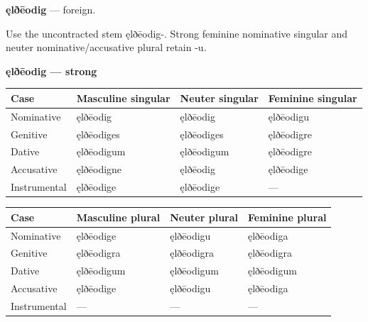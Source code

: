 \par\begin{minipage}{\linewidth}\raggedright
\textbf{ęlðēodig} — foreign.

Use the uncontracted stem ęlðēodig-. Strong feminine nominative singular and neuter nominative/\allowbreak{}accusative plural retain -u.

\textbf{ęlðēodig — strong}

\par\begingroup
\fontsize{10.5}{13.2}\selectfont
\setlength{\LTleft}{0pt}\setlength{\LTright}{\fill}
\noindent
\begin{tabular}{@{}>{\raggedright\arraybackslash}p{22.0mm}>{\raggedright\arraybackslash}p{31.188mm}>{\raggedright\arraybackslash}p{31.188mm}>{\raggedright\arraybackslash}p{31.188mm}@{}}
\toprule
\textbf{Case} & \textbf{Masculine singular} & \textbf{Neuter singular} & \textbf{Feminine singular} \\
\midrule
Nominative & ęlðēodig & ęlðēodig & ęlðēodigu \\
Genitive & ęlðēodiges & ęlðēodiges & ęlðēodigre \\
Dative & ęlðēodigum & ęlðēodigum & ęlðēodigre \\
Accusative & ęlðēodigne & ęlðēodig & ęlðēodige \\
Instrumental & ęlðēodige & ęlðēodige & — \\
\bottomrule
\end{tabular}
\par\endgroup
\end{minipage}\par
\par\addvspace{5pt}
\par\begingroup
\fontsize{10.5}{13.2}\selectfont
\setlength{\LTleft}{0pt}\setlength{\LTright}{\fill}
\noindent
\begin{tabular}{@{}>{\raggedright\arraybackslash}p{22.0mm}>{\raggedright\arraybackslash}p{31.188mm}>{\raggedright\arraybackslash}p{31.188mm}>{\raggedright\arraybackslash}p{31.188mm}@{}}
\toprule
\textbf{Case} & \textbf{Masculine plural} & \textbf{Neuter plural} & \textbf{Feminine plural} \\
\midrule
Nominative & ęlðēodige & ęlðēodigu & ęlðēodiga \\
Genitive & ęlðēodigra & ęlðēodigra & ęlðēodigra \\
Dative & ęlðēodigum & ęlðēodigum & ęlðēodigum \\
Accusative & ęlðēodige & ęlðēodigu & ęlðēodiga \\
Instrumental & — & — & — \\
\bottomrule
\end{tabular}
\par\endgroup

